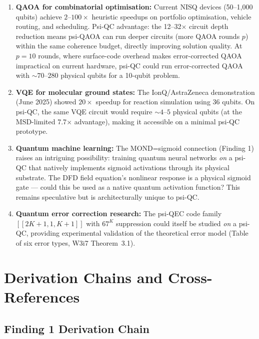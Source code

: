 \documentclass[11pt]{article}
\theoremstyle{definition}
\theoremstyle{remark}
\begin{document}
\begin{enumerate}
\item \textbf{QAOA for combinatorial optimisation:}
  Current NISQ devices (50--1,000 qubits) achieve $2$--$100\times$
  heuristic speedups on portfolio optimisation, vehicle routing, and
  scheduling. Psi-QC advantage: the 12--32$\times$ circuit depth
  reduction means psi-QAOA can run deeper circuits (more QAOA rounds
  $p$) within the same coherence budget, directly improving solution
  quality. At $p = 10$ rounds, where surface-code overhead makes
  error-corrected QAOA impractical on current hardware, psi-QC could
  run error-corrected QAOA with $\sim 70$--$280$ physical qubits for
  a 10-qubit problem.

\item \textbf{VQE for molecular ground states:}
  The IonQ/AstraZeneca demonstration (June 2025) showed $20\times$
  speedup for reaction simulation using 36 qubits. On psi-QC, the
  same VQE circuit would require $\sim 4$--$5$ physical qubits (at the
  MSD-limited 7.7$\times$ advantage), making it accessible on a
  minimal psi-QC prototype.

\item \textbf{Quantum machine learning:}
  The MOND=sigmoid connection (Finding 1) raises an intriguing
  possibility: training quantum neural networks \emph{on} a psi-QC that
  natively implements sigmoid activations through its physical substrate.
  The DFD field equation's nonlinear response is a physical sigmoid gate
  --- could this be used as a native quantum activation function?
  This remains speculative but is architecturally unique to psi-QC.

\item \textbf{Quantum error correction research:}
  The psi-QEC code family $[[2K{+}1,1,K{+}1]]$ with $67^K$ suppression
  could itself be studied \emph{on} a psi-QC, providing experimental
  validation of the theoretical error model (Table of six error types,
  W3i7 Theorem~3.1).
\end{enumerate}

\section{Derivation Chains and Cross-References}
\label{sec:derivation-chains}

\subsection{Finding 1 Derivation Chain}
\end{document}

